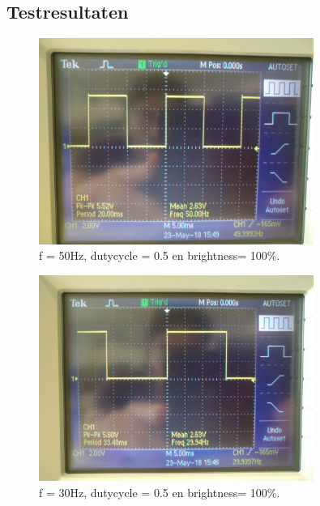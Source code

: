 \documentclass[a4paper,dutch]{article}
\begin{document}



\pagebreak

\begin{appendices}
\section{Testresultaten}
\label{appendix:Testresultaten}
\begin{figure}[H]
\centering
\includegraphics[width=0.8\textwidth]{osc-norm.jpg}
\caption{\label{fig:norm}f = 50Hz, dutycycle = 0.5 en brightness= 100\%.}
\end{figure}

\begin{figure}[H]
\centering
\includegraphics[width=0.8\textwidth]{osc-freq-laag.jpg}
\caption{\label{fig:frlg}f = 30Hz, dutycycle = 0.5 en brightness= 100\%.}
\end{figure}


\end{appendices}
\end{document}
